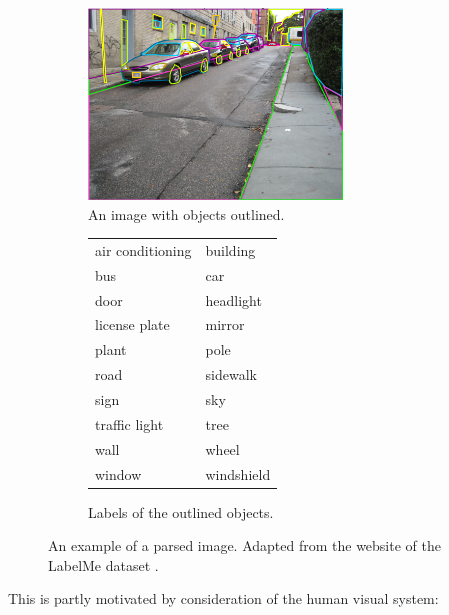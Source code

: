 \begin{figure}[p]
\begin{subfigure}[b]{0.45\textwidth}
\centering
\includegraphics[height=2in]{images/labelmeparse.png}
\caption{An image with objects outlined.}
\end{subfigure}
\begin{subfigure}[b]{0.45\textwidth}
\begin{tabular}{l l}
air conditioning & building\\
bus & car\\
door & headlight\\
license plate & mirror\\
plant & pole\\
road & sidewalk\\
sign & sky\\
traffic light & tree\\
wall & wheel\\
window & windshield\\
\end{tabular}
\caption{Labels of the outlined objects.}
\end{subfigure}
\caption{An example of a parsed image. Adapted from the website of the
  LabelMe dataset \cite{labelme}.}
\label{fig-labelme}
\end{figure}



This is partly motivated by consideration of the human visual system:

